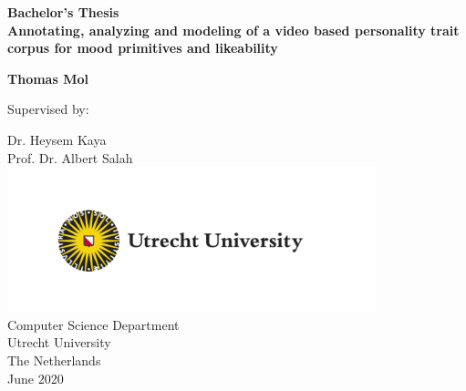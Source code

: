 \begin{titlepage}
    \begin{center}
        \vspace*{1.0cm}
        
        \Huge
            \textbf{Bachelor's Thesis}
         \\
        \vspace{1cm}
        \LARGE
        \textsf{
            \textbf{Annotating, analyzing and modeling of a video based personality trait corpus for mood primitives and likeability}
        }
        \vspace{2cm}
        
        \Large
        \textbf{Thomas Mol} \\
        \vfill
        
     
        \vspace{1cm}
        
        \large
        Supervised by: \\
        \vspace{6pt}
        
        \Large
        Dr. Heysem Kaya\\
        Prof. Dr. Albert Salah\\
        
        \includegraphics[width=0.8\textwidth]{Images/UU_logo_EN_CMYK.png}\\
        
        \large
        Computer Science Department \\
        Utrecht University \\
        The Netherlands\\
        June 2020\\
        
    \end{center}
\end{titlepage}